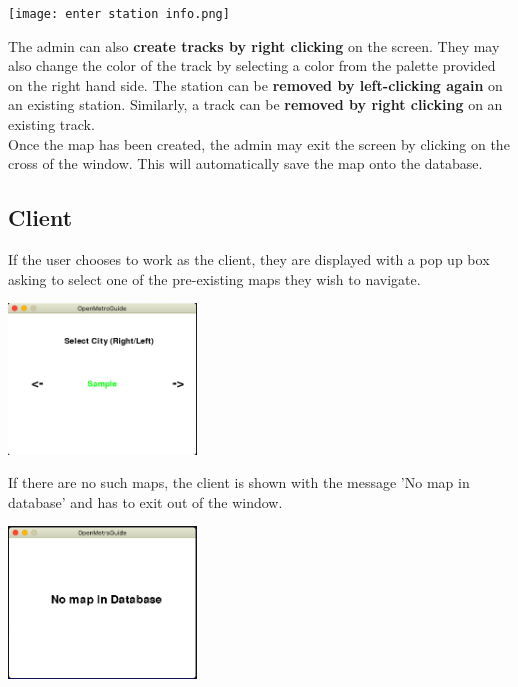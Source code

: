 \documentclass[fontsize=11pt]{article}
\begin{document}
    \begin{center}
        \texttt{[image: enter station info.png]}\\
    \end{center}
    The admin can also \textbf{create tracks by right clicking} on the screen. They may also change the color of the track by selecting a color from the palette provided on the right hand side. The station can be \textbf{removed by left-clicking again} on an existing station. Similarly, a track can be \textbf{removed by right clicking} on an existing track.\\
    Once the map has been created, the admin may exit the screen by clicking on the cross of the window. This will automatically save the map onto the database.

    \subsection*{Client}
    If the user chooses to work as the client, they are displayed with a pop up box asking to select one of the pre-existing maps they wish to navigate.\\
    \begin{center}
        \includegraphics[width = 5cm]{client select city.png}\\
    \end{center}
    If there are no such maps, the client is shown with the message 'No map in database' and has to exit out of the window.\\
    \begin{center}
        \includegraphics[width = 5cm]{no maps in database.png}\\
    \end{center}
\end{document}
